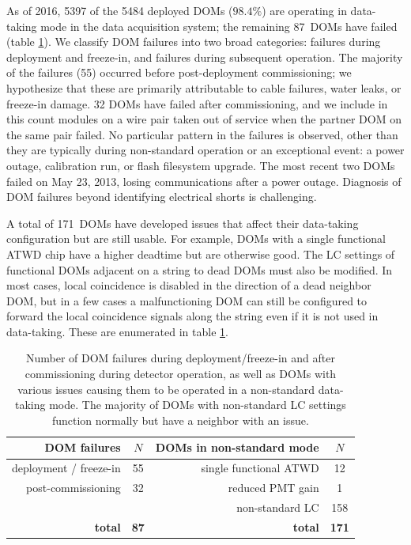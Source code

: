 As of 2016, 5397 of the 5484 deployed DOMs ($98.4\%$) are operating in
data-taking mode in the data acquisition system; the remaining 87~DOMs
have failed (table
\ref{tab:dom_failures}).  We classify DOM 
failures into two broad categories: failures during deployment and
freeze-in, and failures during subsequent operation.  The majority of the
failures (55) occurred before post-deployment commissioning; we hypothesize
that these are primarily attributable to cable failures, water leaks,
or freeze-in damage. 32 DOMs have failed after commissioning, and
we include in this count modules on a wire pair taken out of service when
the partner DOM on the same pair failed.  No particular pattern in the
failures is observed, other than they are typically during non-standard
operation or an exceptional event: a power outage, calibration run, or
flash filesystem upgrade.  The most recent two DOMs failed on May 23, 2013,
losing communications after a power outage.  Diagnosis of DOM failures
beyond identifying electrical shorts is challenging.

A total of 171~DOMs have developed issues that affect their data-taking
configuration but are still usable.  For example, DOMs with a single functional
ATWD chip have a higher deadtime but are otherwise good.  The LC settings
of functional DOMs adjacent on a string to 
dead DOMs must also be modified. In most cases, local coincidence is
disabled in the direction of a dead neighbor DOM, but in a few cases a
malfunctioning DOM can still be configured to forward the local
coincidence signals along the string even if it is not used in
data-taking. These are enumerated in table \ref{tab:dom_failures}.  

\begin{table}[h]
  \centering
  \caption{Number of DOM failures during deployment/freeze-in and after
    commissioning during detector operation, as well as DOMs with various
    issues causing them to be operated in a
    non-standard data-taking mode.  The majority of DOMs with non-standard
    LC settings function normally but have a neighbor with an issue.}  
  \label{tab:dom_failures}
  \begin{tabular}{rc|rc}
    \toprule
    DOM failures & $N$ & DOMs in non-standard mode & $N$\\
    \hline    
    deployment / freeze-in & 55 &single functional ATWD & 12\\
    post-commissioning & 32  & reduced PMT gain & 1 \\
   & & non-standard LC & 158 \\
 \bf{total} & \bf{87} & \bf{total}& \bf{171}\\
    \bottomrule 
  \end{tabular}
\end{table}

